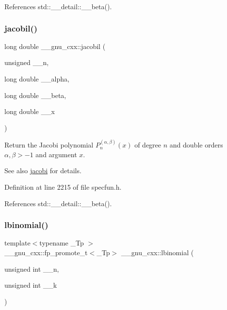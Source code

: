 References std\+::\+\_\+\+\_\+detail\+::\+\_\+\+\_\+beta().

\mbox{\label{group__gnu__math__spec__func_ga2898a5ebf451eaf259ecfcdd171aa72b}} 
\subsubsection{\texorpdfstring{jacobil()}{jacobil()}}
{\footnotesize\ttfamily long double \+\_\+\+\_\+gnu\+\_\+cxx\+::jacobil (\begin{DoxyParamCaption}\item[{unsigned}]{\+\_\+\+\_\+n,  }\item[{long double}]{\+\_\+\+\_\+alpha,  }\item[{long double}]{\+\_\+\+\_\+beta,  }\item[{long double}]{\+\_\+\+\_\+x }\end{DoxyParamCaption})\hspace{0.3cm}{\ttfamily [inline]}}

Return the Jacobi polynomial $ P_n^{(\alpha,\beta)}(x) $ of degree $ n $ and { double} orders $ \alpha, \beta > -1 $ and argument $ x $.

\begin{DoxySeeAlso}{See also}
\hyperlink{group__gnu__math__spec__func_gad54f6601748324d268532138eb38ca33}{jacobi} for details. 
\end{DoxySeeAlso}


Definition at line 2215 of file specfun.\+h.



References std\+::\+\_\+\+\_\+detail\+::\+\_\+\+\_\+beta().

\mbox{\label{group__gnu__math__spec__func_gabfa5aeba56edfa110846fc8e76963bc2}} 
\subsubsection{\texorpdfstring{lbinomial()}{lbinomial()}}
{\footnotesize\ttfamily template$<$typename \+\_\+\+Tp $>$ \\
\+\_\+\+\_\+gnu\+\_\+cxx\+::fp\+\_\+promote\+\_\+t$<$\+\_\+\+Tp$>$ \+\_\+\+\_\+gnu\+\_\+cxx\+::lbinomial (\begin{DoxyParamCaption}\item[{unsigned int}]{\+\_\+\+\_\+n,  }\item[{unsigned int}]{\+\_\+\+\_\+k }\end{DoxyParamCaption})\hspace{0.3cm}{\ttfamily [inline]}}



